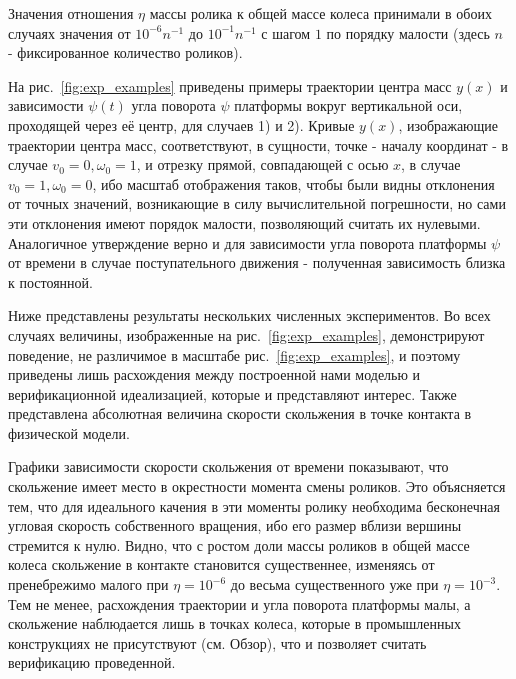 Значения отношения $\eta$ массы ролика к общей массе колеса принимали в обоих случаях значения от $10^{-6}n^{-1}$ до $10^{-1}n^{-1}$ с шагом $1$ по порядку малости (здесь $n$ - фиксированное количество роликов).

На рис.~\ref{fig:exp_examples} приведены примеры траектории центра масс $y(x)$ и зависимости $\psi(t)$ угла поворота $\psi$ платформы вокруг вертикальной оси, проходящей через её центр, для случаев 1) и 2). Кривые $y(x)$, изображающие траектории центра масс, соответствуют, в сущности, точке - началу координат - в случае $v_0 = 0, \omega_0 = 1$, и отрезку прямой, совпадающей с осью $x$, в случае $v_0 = 1, \omega_0 = 0$, ибо масштаб отображения таков, чтобы были видны отклонения от точных значений, возникающие в силу вычислительной погрешности, но сами эти отклонения имеют порядок малости, позволяющий считать их нулевыми. Аналогичное утверждение верно и для зависимости угла поворота платформы $\psi$ от времени в случае поступательного движения - полученная зависимость близка к постоянной.

Ниже представлены результаты нескольких численных экспериментов. Во всех случаях величины, изображенные на рис.~\ref{fig:exp_examples}, демонстрируют поведение, не различимое в масштабе рис.~\ref{fig:exp_examples}, и поэтому приведены лишь расхождения между построенной нами моделью и верификационной идеализацией, которые и представляют интерес. Также представлена абсолютная величина скорости скольжения в точке контакта в физической модели.

Графики зависимости скорости скольжения от времени показывают, что скольжение имеет место в окрестности момента смены роликов. Это объясняется тем, что для идеального качения в эти моменты ролику необходима бесконечная угловая скорость собственного вращения, ибо его размер вблизи вершины стремится к нулю. Видно, что с ростом доли массы роликов в общей массе колеса скольжение в контакте становится существеннее, изменяясь от пренебрежимо малого при $\eta = 10^{-6}$ до весьма существенного уже при $\eta = 10^{-3}$. Тем не менее, расхождения траектории и угла поворота платформы малы, а скольжение наблюдается лишь в точках колеса, которые в промышленных конструкциях не присутствуют (см. Обзор), что и позволяет считать верификацию проведенной.
\newpage

